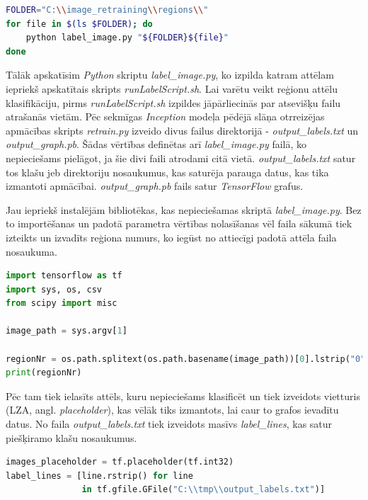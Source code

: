 \documentclass[12pt,paper=a4]{report}
\begin{document}
\begin{lstlisting}[language=bash]
FOLDER="C:\\image_retraining\\regions\\"
for file in $(ls $FOLDER); do
	python label_image.py "${FOLDER}${file}"
done
\end{lstlisting}\par
Tālāk apskatīsim \textit{Python} skriptu \textit{label_image.py}, ko izpilda katram attēlam iepriekš apskatītais skripts \textit{runLabelScript.sh}. Lai varētu veikt reģionu attēlu klasifikāciju, pirms \textit{runLabelScript.sh} izpildes jāpārliecinās par atsevišķu failu atrašanās vietām. Pēc sekmīgas \textit{Inception} modeļa pēdējā slāņa otrreizējas apmācības skripts \textit{retrain.py} izveido divus failus  direktorijā - \textit{output_labels.txt} un \textit{output_graph.pb}. Šādas vērtības definētas arī \textit{label_image.py} failā, ko nepieciešams pielāgot, ja šie divi faili atrodami citā vietā. \textit{output_labels.txt} satur tos klašu jeb direktoriju nosaukumus, kas saturēja parauga datus, kas tika izmantoti apmācībai. \textit{output_graph.pb} fails satur \textit{TensorFlow} grafus.\par
Jau iepriekš instalējām bibliotēkas, kas nepieciešamas skriptā \textit{label_image.py}. Bez to importēšanas un padotā parametra vērtības nolasīšanas vēl faila sākumā tiek izteikts un izvadīts reģiona numurs, ko iegūst no attiecīgi padotā attēla faila nosaukuma.
\begin{lstlisting}[language=python]
import tensorflow as tf
import sys, os, csv
from scipy import misc

image_path = sys.argv[1]

regionNr = os.path.splitext(os.path.basename(image_path))[0].lstrip("0")
print(regionNr)
\end{lstlisting}\par
Pēc tam tiek ielasīts attēls, kuru nepieciešams klasificēt un tiek izveidots vietturis (LZA, angl. \textit{placeholder}), kas vēlāk tiks izmantots, lai caur to grafos ievadītu datus. No faila \textit{output_labels.txt} tiek izveidots masīvs \textit{label_lines}, kas satur piešķiramo klašu nosaukumus.
\begin{lstlisting}[language=python]
images_placeholder = tf.placeholder(tf.int32)
label_lines = [line.rstrip() for line
               in tf.gfile.GFile("C:\\tmp\\output_labels.txt")]
\end{lstlisting}\par
\end{document}
